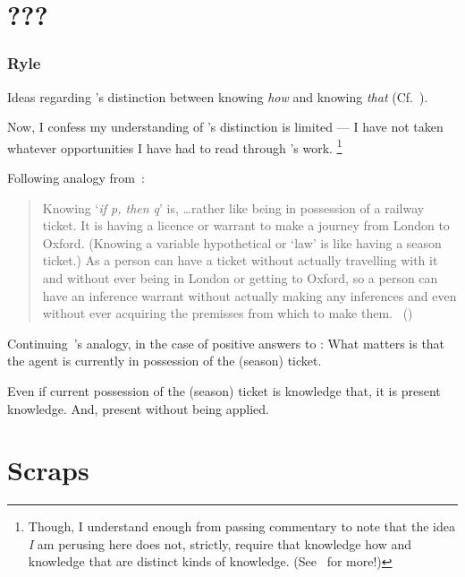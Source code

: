 \section{???}

\subsubsection{Ryle}

\begin{note}
  Ideas regarding \citeauthor{Ryle:1946tu}'s distinction between knowing \emph{how} and knowing \emph{that} (Cf.~\citeyear{Ryle:1946tu}).

  Now, I confess my understanding of \citeauthor{Ryle:1946tu}'s distinction is limited --- I have not taken whatever opportunities I have had to read through \citeauthor{Ryle:1946tu}'s work.%
  \footnote{
    Though, I understand enough from passing commentary to note that the idea \emph{I} am perusing here does not, strictly, require that knowledge how and knowledge that are distinct kinds of knowledge.
    (See~\textcite{Pavese:2022up} for more!)
  }

  Following analogy from~\textcite{Ryle:2009us}:

  \begin{quote}
    Knowing `\emph{if p, then q}' is, \dots rather like being in possession of a railway ticket.
    It is having a licence or warrant to make a journey from London to Oxford.
    (Knowing a variable hypothetical or `law' is like having a season ticket.)
    As a person can have a ticket without actually travelling with it and without ever being in London or getting to Oxford, so a person can have an inference warrant without actually making any inferences and even without ever acquiring the premisses from which to make them.%
    \mbox{ }\hfill\mbox{(\citeyear[250]{Ryle:2009us})}
  \end{quote}

  Continuing~\citeauthor{Ryle:2009us}'s analogy, in the case of positive answers to \qzS{}:
  What matters is that the agent is currently in possession of the (season) ticket.

  Even if current possession of the (season) ticket is knowledge that, it is present knowledge.
  And, present without being applied.
\end{note}

\section{Scraps}
\label{sec:scraps}

